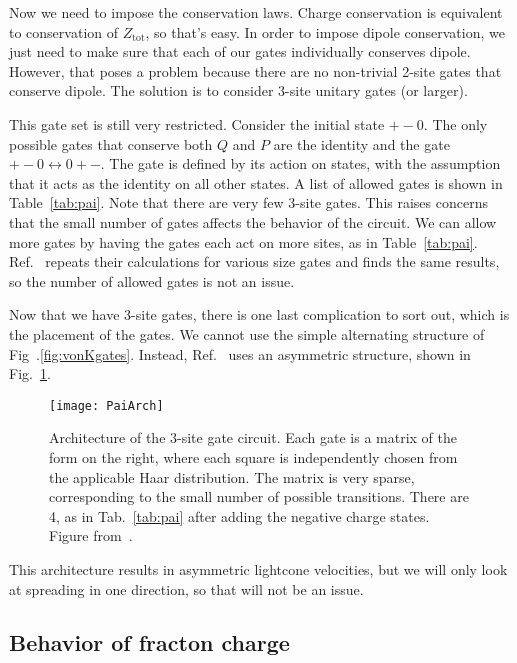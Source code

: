 \documentclass[a4paper,11pt]{article}
\begin{document}
Now we need to impose the conservation laws. Charge conservation is equivalent to conservation of $Z_\text{tot}$, so that's easy. In order to impose dipole conservation, we just need to make sure that each of our gates individually conserves dipole. However, that poses a problem because there are no non-trivial 2-site gates that conserve dipole. The solution is to consider 3-site unitary gates (or larger).

This gate set is still very restricted. Consider the initial state $+-0$. The only possible gates that conserve both $Q$ and $P$ are the identity and the gate $+-0\leftrightarrow 0+-$. The gate is defined by its action on states, with the assumption that it acts as the identity on all other states. A list of allowed gates is shown in Table~\ref{tab:pai}. Note that there are very few 3-site gates. This raises concerns that the small number of gates affects the behavior of the circuit. We can allow more gates by having the gates each act on more sites, as in Table~\ref{tab:pai}. Ref.~\cite{PaiFracton} repeats their calculations for various size gates and finds the same results, so the number of allowed gates is not an issue.


Now that we have 3-site gates, there is one last complication to sort out, which is the placement of the gates. We cannot use the simple alternating structure of Fig~.\ref{fig:vonKgates}. Instead, Ref.~\cite{PaiFracton} uses an asymmetric structure, shown in Fig.~\ref{fig:PaiArch}.
\begin{figure}
	\centering
	\texttt{[image: PaiArch]}
	\caption{Architecture of the 3-site gate circuit. Each gate is a matrix of the form on the right, where each square is independently chosen from the applicable Haar distribution. The matrix is very sparse, corresponding to the small number of possible transitions. There are 4, as in Tab.~\ref{tab:pai} after adding the negative charge states. Figure from~\cite{PaiFracton}.}
	\label{fig:PaiArch}
\end{figure}
This architecture results in asymmetric lightcone velocities, but we will only look at spreading in one direction, so that will not be an issue.

\subsection{Behavior of fracton charge} \label{sub:fraccharge}
\end{document}
